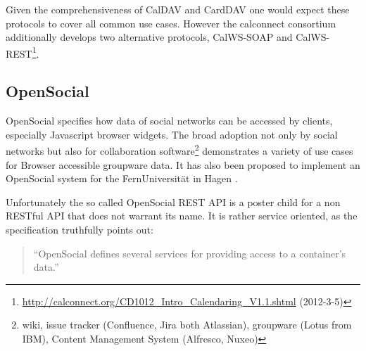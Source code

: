 \documentclass[11pt,a4paper,headsepline,twoside]{scrartcl}		%
\newcommand{\citeurl}[2]{\url{#1} (#2)}
\begin{document}

Given the comprehensiveness of CalDAV and CardDAV one would expect these
protocols to cover all common use cases. However the calconnect consortium
additionally develops two alternative protocols, CalWS-SOAP and
CalWS-REST\footnote{\citeurl{http://calconnect.org/CD1012_Intro_Calendaring_V1.1.shtml}{2012-3-5}}.

\subsection{OpenSocial}
\label{sec:opensocial-background}


OpenSocial \cite{OSSpec2.0.1} specifies how data of social networks can be
accessed by clients, especially Javascript browser widgets. The broad adoption
not only by social networks but also for collaboration software\footnote{wiki,
  issue tracker (Confluence, Jira both Atlassian), groupware (Lotus from IBM),
  Content Management System (Alfresco, Nuxeo)} demonstrates a variety of use
cases for Browser accessible groupware data. It has also been proposed to
implement an OpenSocial system for the FernUniversität in Hagen
\cite{Huebner2009}.

Unfortunately the so called OpenSocial REST API is a poster child for a non
RESTful API that does not warrant its name. It is rather service oriented, as
the specification truthfully points out\cite[Social API Server, sec
2,Services]{OSSpec2.0.1}:
\begin{quote}
  ``OpenSocial defines several services for providing access to a container's data.''
\end{quote}
\end{document}
